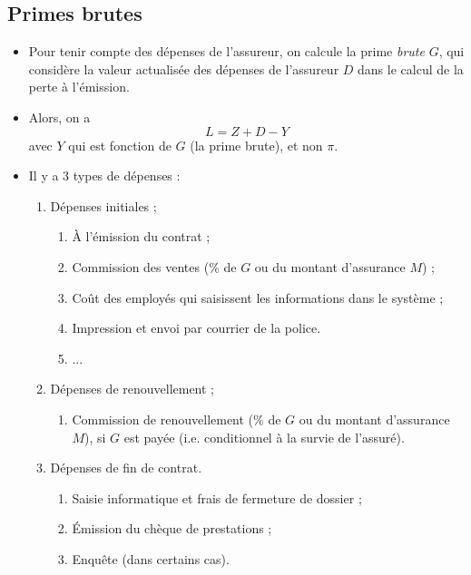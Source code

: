 \documentclass[10pt, french]{article}
\begin{document}
\begin{multicols*}{3}
\subsection{Primes brutes}
\begin{itemize}
\item Pour tenir compte des dépenses de l'assureur, on calcule la prime \emph{brute} $G$, qui considère la valeur actualisée des dépenses de l'assureur $D$ dans le calcul de la perte à l'émission.
\item Alors, on a
\[L = Z + D - Y\]
avec $Y$ qui est fonction de $G$ (la prime brute), et non $\pi$.
\item Il y a 3 types de dépenses : 
\begin{enumerate}[label=\Roman*)]
	\item Dépenses initiales ;
	\begin{enumerate}[label=\textbullet]
		\item À l'émission du contrat ; 
		\item Commission des ventes (\% de $G$ ou du montant d'assurance $M$) ;
		\item Coût des employés qui saisissent les informations dans le système ;
		\item Impression et envoi par courrier de la police.
		\item ...
	\end{enumerate}
	\item Dépenses de renouvellement ;
	\begin{enumerate}[label=\textbullet]
		\item Commission de renouvellement (\% de $G$ ou du montant d'assurance $M$), si $G$ est payée (i.e. conditionnel à la survie de l'assuré).
	\end{enumerate}
	\item Dépenses de fin de contrat.
	\begin{enumerate}[label=\textbullet]
		\item Saisie informatique et frais de fermeture de dossier ;
		\item Émission du chèque de prestations ;
		\item Enquête (dans certains cas).
	\end{enumerate}
\end{enumerate}
\end{itemize}











\end{multicols*}
\end{document}
